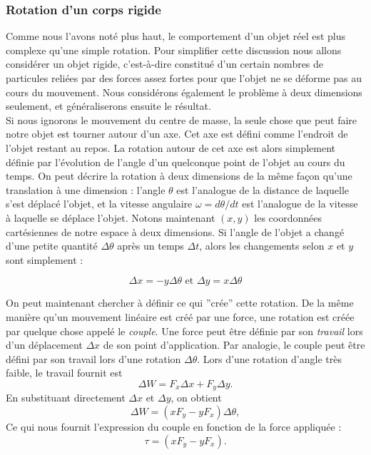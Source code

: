 \subsubsection{Rotation d'un corps rigide}
Comme nous l'avons noté plus haut, le comportement d'un objet réel est plus complexe qu'une simple rotation. Pour simplifier cette discussion nous allons considérer un objet rigide, c'est-à-dire constitué d'un certain nombres de particules reliées par des forces assez fortes pour que l'objet ne se déforme pas au cours du mouvement. Nous considérons également le problème à deux dimensions seulement, et généraliserons ensuite le résultat.\\
Si nous ignorons le mouvement du centre de masse, la seule chose que peut faire notre objet est tourner autour d'un axe. Cet axe est défini comme l'endroit de l'objet restant au repos. La rotation autour de cet axe est alors simplement définie par l'évolution de l'angle d'un quelconque point de l'objet au cours du temps. On peut décrire la rotation à deux dimensions de la même façon qu'une translation à une dimension : l'angle $\theta$ est l'analogue de la distance de laquelle s'est déplacé l'objet, et la vitesse angulaire $\omega=d\theta/dt$ est l'analogue de la vitesse à laquelle se déplace l'objet. Notons maintenant $(x,y)$ les coordonnées cartésiennes de notre espace à deux dimensions. Si l'angle de l'objet a changé d'une petite quantité $\Delta\theta$ après un temps $\Delta t$, alors les changements selon $x$ et $y$ sont simplement :

\begin{equation}
\Delta x = -y\Delta \theta \mbox{ et } \Delta y = x\Delta \theta
\end{equation}

On peut maintenant chercher à définir ce qui ''crée'' cette rotation. De la même manière qu'un mouvement linéaire est créé par une force, une rotation est créée par quelque chose appelé le \textit{couple}. Une force peut être définie par son \textit{travail} lors d'un déplacement $\Delta x$ de son point d'application. Par analogie, le couple peut être défini par son travail lors d'une rotation $\Delta \theta$. Lors d'une rotation d'angle très faible, le travail fournit est 
\begin{equation}
\Delta W = F_x \Delta x + F_y \Delta y.
\end{equation}
En substituant directement $\Delta x$ et $\Delta y$, on obtient
\begin{equation}
\Delta W = (xF_y-yF_x)\Delta \theta,
\end{equation}
Ce qui nous fournit l'expression du couple en fonction de la force appliquée :
\begin{equation}
\tau = (xF_y-yF_x).
\end{equation}

